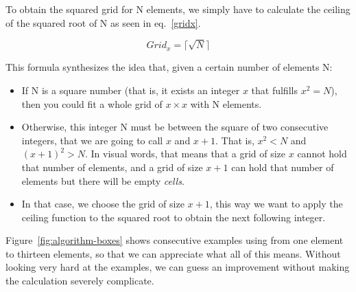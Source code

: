 To obtain the squared grid for N elements, we simply have to calculate the ceiling of the squared root of N as seen in eq.~\eqref{gridx}.

\begin{equation}
  Grid_{x} = \lceil\sqrt{N}\rceil \label{gridx}
\end{equation}

This formula synthesizes the idea that, given a certain number of elements N:

\begin{itemize}
  \item If N is a square number (that is, it exists an integer $x$ that fulfills $x^2 = N$), then you could fit a whole grid of $x\times{}x$ with N elements.
  \item Otherwise, this integer N must be between the square of two consecutive integers, that we are going to call $x$ and $x+1$.
  That is, $x^2 < N$ and $(x+1)^2 > N$.
  In visual words, that means that a grid of size $x$ cannot hold that number of elements, and a grid of size $x+1$ can hold that number of elements but there will be empty \emph{cells}.
  \item In that case, we choose the grid of size $x+1$, this way we want to apply the ceiling function to the squared root to obtain the next following integer.
\end{itemize}

Figure~\vref{fig:algorithm-boxes} shows consecutive examples using from one element to thirteen elements, so that we can appreciate what all of this means.
Without looking very hard at the examples, we can guess an improvement without making the calculation severely complicate.

